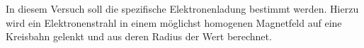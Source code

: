 In diesem Versuch soll die spezifische Elektronenladung bestimmt werden.
Hierzu wird ein Elektronenstrahl in einem möglichst homogenen Magnetfeld auf eine Kreisbahn gelenkt und aus deren Radius der Wert berechnet.
